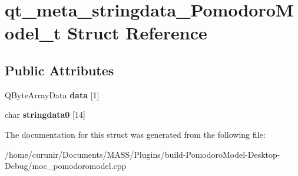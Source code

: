 \hypertarget{structqt__meta__stringdata___pomodoro_model__t}{}\section{qt\+\_\+meta\+\_\+stringdata\+\_\+\+Pomodoro\+Model\+\_\+t Struct Reference}
\label{structqt__meta__stringdata___pomodoro_model__t}
\subsection*{Public Attributes}
\begin{DoxyCompactItemize}
\item 
Q\+Byte\+Array\+Data {\bfseries data} \mbox{[}1\mbox{]}\hypertarget{structqt__meta__stringdata___pomodoro_model__t_aa49d46235c02c881086d48be622c90d5}{}\label{structqt__meta__stringdata___pomodoro_model__t_aa49d46235c02c881086d48be622c90d5}

\item 
char {\bfseries stringdata0} \mbox{[}14\mbox{]}\hypertarget{structqt__meta__stringdata___pomodoro_model__t_a34d2c9f7a75a666ef4cab3d05f4702f4}{}\label{structqt__meta__stringdata___pomodoro_model__t_a34d2c9f7a75a666ef4cab3d05f4702f4}

\end{DoxyCompactItemize}


The documentation for this struct was generated from the following file\+:\begin{DoxyCompactItemize}
\item 
/home/curunir/\+Documents/\+M\+A\+S\+S/\+Plugins/build-\/\+Pomodoro\+Model-\/\+Desktop-\/\+Debug/moc\+\_\+pomodoromodel.\+cpp\end{DoxyCompactItemize}
